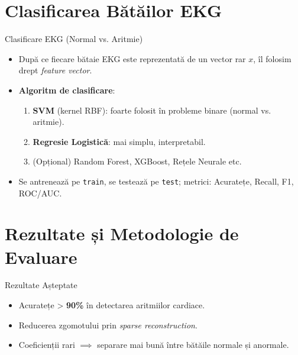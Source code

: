 \documentclass[aspectratio=169,xcolor=dvipsnames]{beamer}
\begin{document}
\section{Clasificarea Bătăilor EKG}

\begin{frame}{Clasificare EKG (Normal vs. Aritmie)}
  \begin{itemize}
    \item După ce fiecare bătaie EKG este reprezentată de un vector rar \(x\), îl folosim drept \emph{feature vector}.
    \item \textbf{Algoritm de clasificare}:
    \begin{enumerate}
      \item \textbf{SVM} (kernel RBF): foarte folosit în probleme binare (normal vs. aritmie).
      \item \textbf{Regresie Logistică}: mai simplu, interpretabil.
      \item (Opțional) Random Forest, XGBoost, Rețele Neurale etc.
    \end{enumerate}
    \item Se antrenează pe \texttt{train}, se testează pe \texttt{test}; metrici: Acuratețe, Recall, F1, ROC/AUC.
  \end{itemize}
\end{frame}

\section{Rezultate și Metodologie de Evaluare}

\begin{frame}{Rezultate Așteptate}
  \begin{itemize}
    \item Acuratețe > \textbf{90\%} în detectarea aritmiilor cardiace.
    \item Reducerea zgomotului prin \emph{sparse reconstruction}.
    \item Coeficienții rari \(\implies\) separare mai bună între bătăile normale și anormale.
  \end{itemize}
\end{frame}
\end{document}
